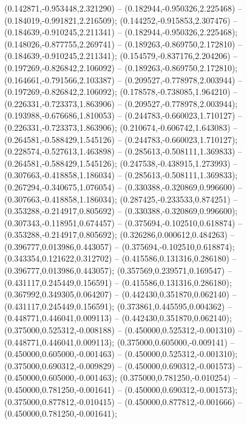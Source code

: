  (0.142871,-0.953448,2.321290) -- (0.182944,-0.950326,2.225468) -- (0.184019,-0.991821,2.216509);
 (0.144252,-0.915853,2.307476) -- (0.184639,-0.910245,2.211341) -- (0.182944,-0.950326,2.225468);
 (0.148026,-0.877755,2.269741) -- (0.189263,-0.869750,2.172810) -- (0.184639,-0.910245,2.211341);
 (0.154579,-0.837176,2.204206) -- (0.197269,-0.826842,2.106092) -- (0.189263,-0.869750,2.172810);
 (0.164661,-0.791566,2.103387) -- (0.209527,-0.778978,2.003944) -- (0.197269,-0.826842,2.106092);
 (0.178578,-0.738085,1.964210) -- (0.226331,-0.723373,1.863906) -- (0.209527,-0.778978,2.003944);
 (0.193988,-0.676686,1.810053) -- (0.244783,-0.660023,1.710127) -- (0.226331,-0.723373,1.863906);
 (0.210674,-0.606742,1.643083) -- (0.264581,-0.588429,1.545126) -- (0.244783,-0.660023,1.710127);
 (0.228574,-0.527613,1.463898) -- (0.285613,-0.508111,1.369833) -- (0.264581,-0.588429,1.545126);
 (0.247538,-0.438915,1.273993) -- (0.307663,-0.418858,1.186034) -- (0.285613,-0.508111,1.369833);
 (0.267294,-0.340675,1.076054) -- (0.330388,-0.320869,0.996600) -- (0.307663,-0.418858,1.186034);
 (0.287425,-0.233533,0.874251) -- (0.353288,-0.214917,0.805692) -- (0.330388,-0.320869,0.996600);
 (0.307343,-0.118951,0.674457) -- (0.375694,-0.102510,0.618874) -- (0.353288,-0.214917,0.805692);
 (0.326286,0.000612,0.484263) -- (0.396777,0.013986,0.443057) -- (0.375694,-0.102510,0.618874);
 (0.343354,0.121622,0.312702) -- (0.415586,0.131316,0.286180) -- (0.396777,0.013986,0.443057);
 (0.357569,0.239571,0.169547) -- (0.431117,0.245449,0.156591) -- (0.415586,0.131316,0.286180);
 (0.367992,0.349305,0.064207) -- (0.442430,0.351870,0.062140) -- (0.431117,0.245449,0.156591);
 (0.373861,0.445595,0.004362) -- (0.448771,0.446041,0.009113) -- (0.442430,0.351870,0.062140);
 (0.375000,0.525312,-0.008188) -- (0.450000,0.525312,-0.001310) -- (0.448771,0.446041,0.009113);
 (0.375000,0.605000,-0.009141) -- (0.450000,0.605000,-0.001463) -- (0.450000,0.525312,-0.001310);
 (0.375000,0.690312,-0.009829) -- (0.450000,0.690312,-0.001573) -- (0.450000,0.605000,-0.001463);
 (0.375000,0.781250,-0.010254) -- (0.450000,0.781250,-0.001641) -- (0.450000,0.690312,-0.001573);
 (0.375000,0.877812,-0.010415) -- (0.450000,0.877812,-0.001666) -- (0.450000,0.781250,-0.001641);

